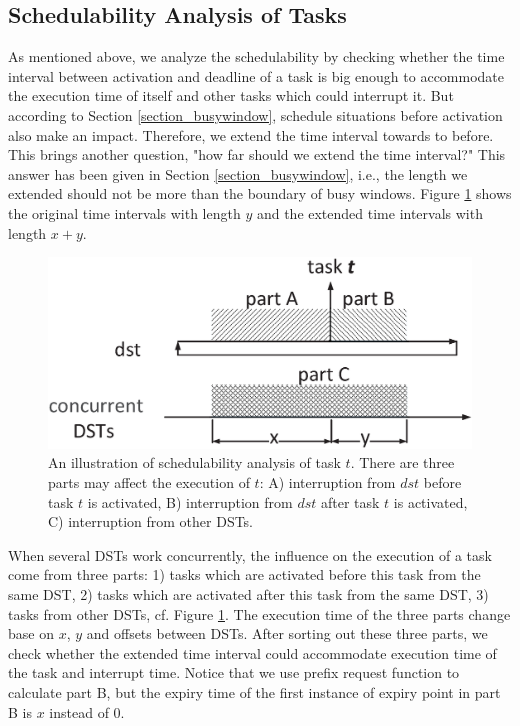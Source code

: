 \documentclass[sigconf]{acmart}
\begin{document}
\subsection{Schedulability Analysis of Tasks}
As mentioned above, we analyze the schedulability by checking whether the time interval between activation and deadline of a task is big enough to accommodate the execution time of itself and other tasks which could interrupt it. But according to Section \ref{section_busywindow}, schedule situations before activation also make an impact. Therefore, we extend the time interval towards to before. This brings another question, "how far should we extend the time interval?" This answer has been given in Section \ref{section_busywindow}, i.e., the length we extended should not be more than the boundary of busy windows. Figure \ref{figure_3parts} shows the original time intervals with length $y$ and the extended time intervals with length $x+y$.
\begin{figure}
  \centering
  \includegraphics[scale=0.3]{graphics/figure_3parts.eps}
  \caption{An illustration of schedulability analysis of task $t$. There are three parts may affect the execution of $t$: A) interruption from $dst$ before task $t$ is activated, B) interruption from $dst$ after task $t$ is activated, C) interruption from other DSTs.}
  \label{figure_3parts}
\end{figure}

When several DSTs work concurrently, the influence on the execution of a task come from three parts: 1) tasks which are activated before this task from the same DST, 2) tasks which are activated after this task from the same DST, 3) tasks from other DSTs, cf. Figure \ref{figure_3parts}. The execution time of the three parts change base on $x$, $y$ and offsets between DSTs. After sorting out these three parts, we check whether the extended time interval could accommodate execution time of the task and interrupt time. Notice that we use prefix request function to calculate part B, but the expiry time of the first instance of expiry point in part B is $x$ instead of 0.
\end{document}
